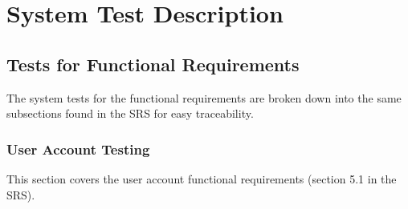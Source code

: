\documentclass[12pt, titlepage]{article}
\begin{document}
    \section{System Test Description}

    \subsection{Tests for Functional Requirements}

    The system tests for the functional requirements are broken down into the same subsections found in the SRS for easy traceability.

    \subsubsection{User Account Testing}
    This section covers the user account functional requirements (section 5.1 in the SRS).
\end{document}
